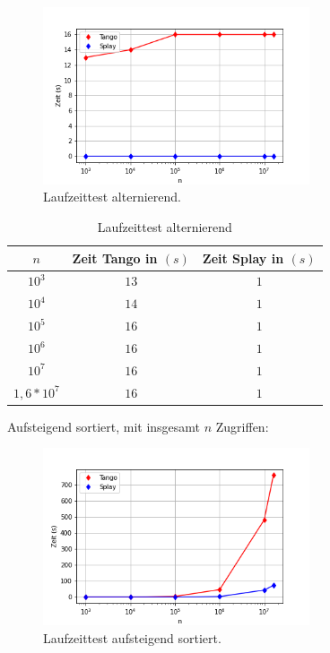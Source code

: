 \documentclass[a4paper,12pt]{article}
\begin{document}
\begin{figure}[H]
	\centering
	\includegraphics[width=0.7\textwidth]{"Medien/laufzeittest/diagramm/kleinGros"}
	\caption{Laufzeittest alternierend.}
\end{figure}
\begin{table}[H]
	\begin{center}
		\begin{tabular}[c]{|c|c|c|}
			\hline
			$n$ & Zeit Tango in $\left(s\right)$ &Zeit Splay in $\left(s\right)$ \\
			\hline
			$10^3$ & $13$ &$1$ \\
			\hline
			$10^4$  & $14$ &$1$  \\
			\hline
			$10^5$  & $16$ &$1$  \\
			\hline
			$10^6$  & $16$ &$1$  \\
			\hline
			$10^7$  & $16$ &$1$  \\
			\hline
			$1,6 *10^7$  & $16$ &$1$  \\
			\hline
		\end{tabular}
		\caption{Laufzeittest alternierend} 
	\end{center}
\end{table}
\noindent Aufsteigend sortiert, mit insgesamt $n$ Zugriffen:
\begin{figure}[H]
	\centering
	\includegraphics[width=0.7\textwidth]{"Medien/laufzeittest/diagramm/sorted1"}
	\caption{Laufzeittest aufsteigend sortiert.}
\end{figure}
\end{document}

